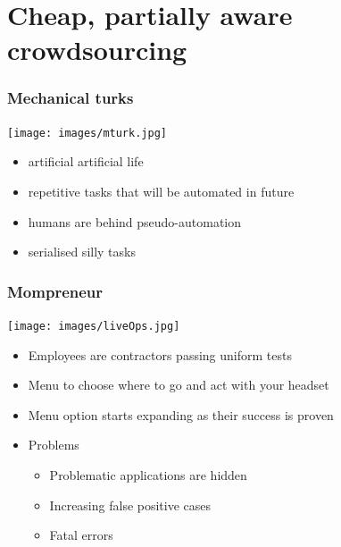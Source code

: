 \documentclass{beamer}
\begin{document}
\section{Cheap, partially aware crowdsourcing}
\label{sec-5}
\begin{frame}
\frametitle{Mechanical turks}
\label{sec-5_1}


 \texttt{[image: images/mturk.jpg]}

\begin{itemize}
\item artificial artificial life
\item repetitive tasks that will be automated in future
\item humans are behind pseudo-automation
\item serialised silly  tasks
\end{itemize}
\end{frame}
\begin{frame}
\frametitle{Mompreneur}
\label{sec-5_2}


  \texttt{[image: images/liveOps.jpg]}

\begin{itemize}
\item Employees are contractors passing uniform tests
\item Menu to choose where to go and act with your headset
\item Menu option starts expanding as their success is proven
\end{itemize}

 
\begin{itemize}

\item Problems\\
\label{sec-5_2_1}%
\begin{itemize}
\item Problematic applications are hidden
\item Increasing false positive cases
\item Fatal errors
\end{itemize}


\end{itemize} %
\end{frame}
\end{document}
